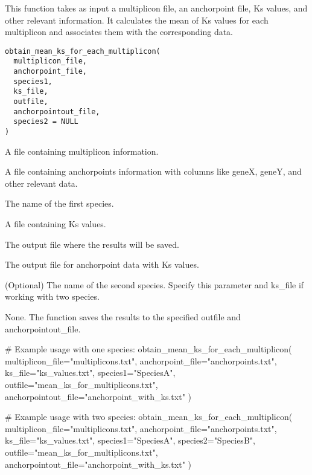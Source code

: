\documentclass[a4paper]{book}
\begin{document}
%
\begin{Description}\relax
This function takes as input a multiplicon file, an anchorpoint file, Ks values, and other relevant information.
It calculates the mean of Ks values for each multiplicon and associates them with the corresponding data.
\end{Description}
%
\begin{Usage}
\begin{verbatim}
obtain_mean_ks_for_each_multiplicon(
  multiplicon_file,
  anchorpoint_file,
  species1,
  ks_file,
  outfile,
  anchorpointout_file,
  species2 = NULL
)
\end{verbatim}
\end{Usage}
%
\begin{Arguments}
\begin{ldescription}
\item[\code{multiplicon\_file}] A file containing multiplicon information.

\item[\code{anchorpoint\_file}] A file containing anchorpoints information with columns like geneX, geneY, and other relevant data.

\item[\code{species1}] The name of the first species.

\item[\code{ks\_file}] A file containing Ks values.

\item[\code{outfile}] The output file where the results will be saved.

\item[\code{anchorpointout\_file}] The output file for anchorpoint data with Ks values.

\item[\code{species2}] (Optional) The name of the second species. Specify this parameter and ks\_file if working with two species.
\end{ldescription}
\end{Arguments}
%
\begin{Value}
None. The function saves the results to the specified outfile and anchorpointout\_file.
\end{Value}
%
\begin{Examples}
\begin{ExampleCode}
# Example usage with one species:
obtain_mean_ks_for_each_multiplicon(
    multiplicon_file="multiplicons.txt",
    anchorpoint_file="anchorpoints.txt",
    ks_file="ks_values.txt",
    species1="SpeciesA",
    outfile="mean_ks_for_multiplicons.txt",
    anchorpointout_file="anchorpoint_with_ks.txt"
)

# Example usage with two species:
obtain_mean_ks_for_each_multiplicon(
    multiplicon_file="multiplicons.txt",
    anchorpoint_file="anchorpoints.txt",
    ks_file="ks_values.txt",
    species1="SpeciesA",
    species2="SpeciesB",
    outfile="mean_ks_for_multiplicons.txt",
    anchorpointout_file="anchorpoint_with_ks.txt"
)
\end{ExampleCode}
\end{Examples}
\end{document}
